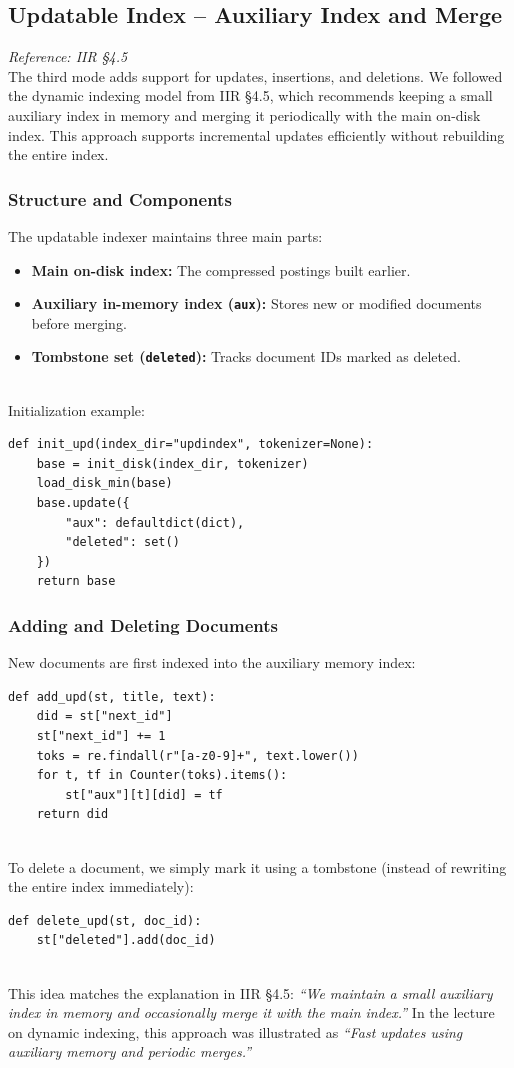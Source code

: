 \documentclass[11pt,a4paper]{article}
\begin{document}
\subsection{Updatable Index – Auxiliary Index and Merge}
\label{subsec:updatable}
\textit{Reference: IIR §4.5}
\\
The third mode adds support for updates, insertions, and deletions.  
We followed the dynamic indexing model from IIR §4.5, which recommends keeping a small auxiliary index in memory and merging it periodically with the main on-disk index.
This approach supports incremental updates efficiently without rebuilding the entire index.

\subsubsection{Structure and Components}

The updatable indexer maintains three main parts:
\begin{itemize}
    \item \textbf{Main on-disk index:} The compressed postings built earlier.
    \item \textbf{Auxiliary in-memory index (\texttt{aux}):} Stores new or modified documents before merging.
    \item \textbf{Tombstone set (\texttt{deleted}):} Tracks document IDs marked as deleted.
\end{itemize}
\\
Initialization example:
\begin{verbatim}
def init_upd(index_dir="updindex", tokenizer=None):
    base = init_disk(index_dir, tokenizer)
    load_disk_min(base)
    base.update({
        "aux": defaultdict(dict),
        "deleted": set()
    })
    return base
\end{verbatim}
\newpage
\subsubsection{Adding and Deleting Documents}

New documents are first indexed into the auxiliary memory index:
\begin{verbatim}
def add_upd(st, title, text):
    did = st["next_id"]
    st["next_id"] += 1
    toks = re.findall(r"[a-z0-9]+", text.lower())
    for t, tf in Counter(toks).items():
        st["aux"][t][did] = tf
    return did
\end{verbatim}
\\
To delete a document, we simply mark it using a tombstone (instead of rewriting the entire index immediately):
\begin{verbatim}
def delete_upd(st, doc_id):
    st["deleted"].add(doc_id)
\end{verbatim}
\\
This idea matches the explanation in IIR §4.5:
\textit{“We maintain a small auxiliary index in memory and occasionally merge it with the main index.”}
In the lecture on dynamic indexing, this approach was illustrated as 
\textit{“Fast updates using auxiliary memory and periodic merges.”}
\end{document}
